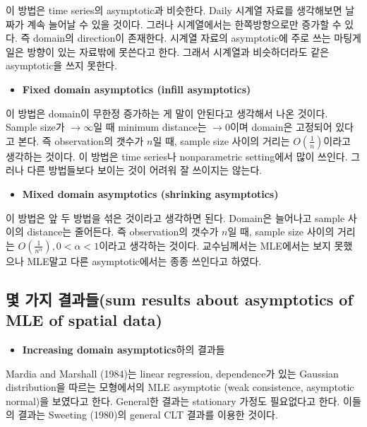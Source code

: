 \documentclass[b5paper,]{book}
\providecommand{\tightlist}{%
  \setlength{\itemsep}{0pt}\setlength{\parskip}{0pt}}
\theoremstyle{definition}
\theoremstyle{definition}
\theoremstyle{definition}
\theoremstyle{remark}
\begin{document}
이 방법은 time series의 asymptotic과 비슷한다. Daily 시계열 자료를
생각해보면 날짜가 계속 늘어날 수 있을 것이다. 그러나 시계열에서는
한쪽방향으로만 증가할 수 있다. 즉 domain의 direction이 존재한다. 시계열
자료의 asymptotic에 주로 쓰는 마팅게일은 방향이 있는 자료밖에 못쓴다고
한다. 그래서 시계열과 비슷하더라도 같은 asymptotic을 쓰지 못한다.

\begin{itemize}
\tightlist
\item
  \textbf{Fixed domain asymptotics (infill asymptotics)}
\end{itemize}

이 방법은 domain이 무한정 증가하는 게 말이 안된다고 생각해서 나온
것이다. Sample size가 \(\rightarrow \infty\)일 때 minimum distance는
\(\rightarrow 0\)이며 domain은 고정되어 있다고 본다. 즉 observation의
갯수가 \(n\)일 때, sample size 사이의 거리는 \(O(\frac{1}{n})\)이라고
생각하는 것이다. 이 방법은 time series나 nonparametric setting에서 많이
쓰인다. 그러나 다른 방법들보다 보이는 것이 어려워 잘 쓰이지는 않는다.

\begin{itemize}
\tightlist
\item
  \textbf{Mixed domain asymptotics (shrinking asymptotics)}
\end{itemize}

이 방법은 앞 두 방법을 섞은 것이라고 생각하면 된다. Domain은 늘어나고
sample 사이의 distance는 줄어든다. 즉 observation의 갯수가 \(n\)일 때,
sample size 사이의 거리는
\(O(\frac{1}{n^{\alpha}}), 0 <\alpha <1\)이라고 생각하는 것이다.
교수님께서는 MLE에서는 보지 못했으나 MLE말고 다른 asymptotic에서는 종종
쓰인다고 하였다.

\subsection{몇 가지 결과들(sum results about asymptotics of MLE of
spatial
data)}\label{--sum-results-about-asymptotics-of-mle-of-spatial-data}

\begin{itemize}
\tightlist
\item
  \textbf{Increasing domain asymptotics}하의 결과들
\end{itemize}

Mardia and Marshall (1984)는 linear regression, dependence가 있는
Gaussian distribution을 따르는 모형에서의 MLE asymptotic (weak
consistence, asymptotic normal)을 보였다고 한다. General한 결과는
stationary 가정도 필요없다고 한다. 이들의 결과는 Sweeting (1980)의
general CLT 결과를 이용한 것이다.
\end{document}
